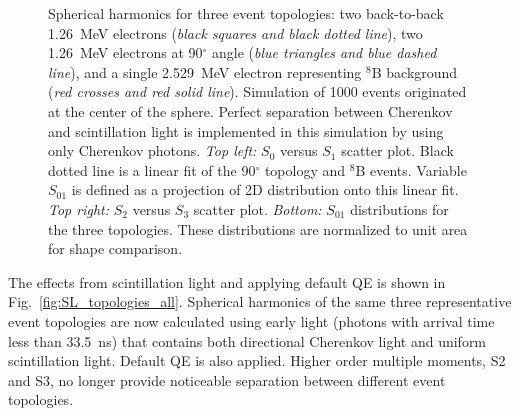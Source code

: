 \begin{figure}[h]
  \caption{Spherical harmonics for three event topologies: two
    back-to-back 1.26~MeV electrons (\emph{black squares and black
      dotted line}), two 1.26~MeV electrons at 90$^{\circ}$ angle
    (\emph{blue triangles and blue dashed line}), and a single
    2.529~MeV electron representing $^{8}$B background (\emph{red
      crosses and red solid line}). Simulation of 1000 events
    originated at the center of the sphere. Perfect separation between
    Cherenkov and scintillation light is implemented in this
    simulation by using only Cherenkov photons. \emph{Top left:} $S_0$
    versus $S_1$ scatter plot. Black dotted line is a linear fit of
    the 90$^{\circ}$ topology and $^{8}$B events. Variable $S_{01}$ is
    defined as a projection of 2D distribution onto this linear
    fit. \emph{Top right:} $S_2$ versus $S_3$ scatter
    plot. \emph{Bottom:} $S_{01}$ distributions for the three
    topologies. These distributions are normalized to unit area for
    shape comparison.}
  \label{fig:SL_topologies_CHE}
\end{figure}


The effects from scintillation light and applying default QE is shown
in Fig.~\ref{fig:SL_topologies_all}. Spherical harmonics of the same
three representative event topologies are now calculated using early
light (photons with arrival time less than 33.5~ns) that contains both
directional Cherenkov light and uniform scintillation light. Default
QE is also applied. Higher order multiple moments, S2 and S3, no
longer provide noticeable separation between different event
topologies.


